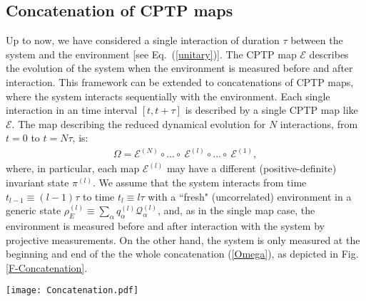 \documentclass[aps,prx,twocolumn,showpacs,floatfix,superscriptaddress,graphics,longbibliography]{revtex4-1}
\newcommand{\E}{{\mathcal E}}
\newcommand{\HAT}{}
\begin{document}
\subsection{Concatenation of CPTP maps} \label{S-Concatenations}

Up to now, we have considered a single interaction of duration $\tau$ between the system and the environment [see Eq.~(\ref{unitary})]. 
The CPTP map $\E$ describes the evolution of the system when the environment is measured before and after interaction. 
This framework can be extended to  concatenations of CPTP maps, where the system interacts sequentially 
with the environment. Each single interaction in an time interval $[t,t + \tau]$ is described by a single CPTP map like $\E$. The map describing the reduced dynamical evolution for $N$ interactions, from $t=0$ to $t= N \tau$, is:
\begin{eqnarray}\label{Omega}
\HAT{\Omega} = \E^{(N)} \circ ... \circ~\E^{(l)} \circ ...\circ ~\E^{(1)},
\end{eqnarray}
where, in particular, each map $\E^{(l)}$ may have a different (positive-definite) invariant state $\pi^{(l)}$. We assume that the system interacts 
from time $t_{l-1} \equiv (l-1) \tau$ to time $t_l \equiv l \tau$ with a ``fresh" (uncorrelated) environment in a generic state 
$\rho_E^{(l)} \equiv \sum_{\alpha} q_{\alpha}^{(l)} \HAT{\mathcal{Q}}_{\alpha}^{(l)}$, and, as in the single map case, the environment is measured before and after interaction with 
the system by projective measurements. On the other hand, the system is only measured at the beginning and end of the the whole concatenation (\ref{Omega}), as depicted in Fig. \ref{F-Concatenation}.

\begin{figure*}[t]
\texttt{[image: Concatenation.pdf]}
\caption{(a) Schematic diagram of a trajectory generated by the maps concatenation. Projective measurements on the system are only performed at the begging and at the end of the 
concatenation. (b) Any operation $\E_{\mu_l, \nu_l}^{(l)}$ in the concatenation consists in the interaction of the system with an environmental ancilla in the state $\rho_E^{(l)}$ via the 
unitary $\hat{U}_\Lambda^{(l)}$ depending on the protocol $\Lambda_l$. The ancilla is measured before and after interaction generating outcomes $\nu_l$ and $\mu_l$ respectively.} 
\label{F-Concatenation}
\end{figure*}
\end{document}
